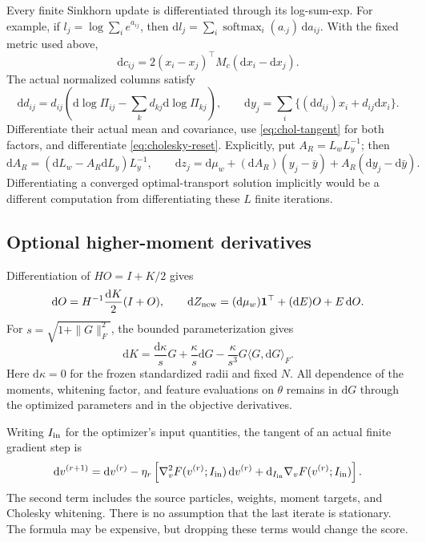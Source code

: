 \documentclass[11pt,a4paper]{article}
\newcommand{\one}{\mathbf 1}
\newcommand{\dd}{\mathrm d}
\newcommand{\softmax}{\operatorname{softmax}}
\begin{document}
Every finite Sinkhorn update is differentiated through its log-sum-exp.
For example, if \(l_j=\log\sum_i e^{a_{ij}}\), then
\(\dd l_j=\sum_i\softmax_i(a_{\cdot j})\,\dd a_{ij}\).
With the fixed metric used above,
\[
 \dd c_{ij}
 =2(x_i-x_j)^\top M_c(\dd x_i-\dd x_j).
\]
The actual normalized columns satisfy
\[
 \dd d_{ij}
 =d_{ij}\left(\dd\log\Pi_{ij}
       -\sum_kd_{kj}\dd\log\Pi_{kj}\right),\qquad
 \dd y_j=\sum_i\{(\dd d_{ij})x_i+d_{ij}\dd x_i\}.
\]
Differentiate their actual mean and covariance, use
\eqref{eq:chol-tangent} for both factors, and differentiate
\eqref{eq:cholesky-reset}. Explicitly, put
\(A_R=L_wL_y^{-1}\); then
\[
 \dd A_R=(\dd L_w-A_R\dd L_y)L_y^{-1},\qquad
 \dd z_j=\dd\mu_w+(\dd A_R)(y_j-\bar y)
                         +A_R(\dd y_j-\dd\bar y).
\]
Differentiating a converged optimal-transport solution implicitly would
be a different computation from differentiating these \(L\) finite
iterations.

\subsection{Optional higher-moment derivatives}

Differentiation of \(HO=I+K/2\) gives
\begin{equation}
\label{eq:cayley-tangent}
 \dd O=H^{-1}\frac{\dd K}{2}(I+O),\qquad
 \dd Z_{\rm new}=(\dd\mu_w)\one^\top+(\dd E)O+E\,\dd O .
\end{equation}
For \(s=\sqrt{1+\|G\|_F^2}\), the bounded parameterization gives
\[
 \dd K=\frac{\dd\kappa}{s}G+\frac{\kappa}{s}\dd G
       -\frac{\kappa}{s^3}G\langle G,\dd G\rangle_F.
\]
Here \(\dd\kappa=0\) for the frozen standardized radii and fixed \(N\).
All dependence of the moments, whitening factor, and feature evaluations
on \(\theta\) remains in \(\dd G\) through the optimized parameters
and in the objective derivatives.

Writing \(I_{\rm in}\) for the optimizer's input quantities, the tangent
of an actual finite gradient step is
\begin{equation}
\label{eq:optimizer-tangent}
 \dd v^{(r+1)}
 =\dd v^{(r)}
 -\eta_r\left[
   \nabla_v^2F(v^{(r)};I_{\rm in})\,\dd v^{(r)}
   +\dd_{I_{\rm in}}\nabla_vF(v^{(r)};I_{\rm in})\right].
\end{equation}
The second term includes the source particles, weights, moment targets,
and Cholesky whitening. There is no assumption that the last iterate is
stationary. The formula may be expensive, but dropping these terms would
change the score.
\end{document}
